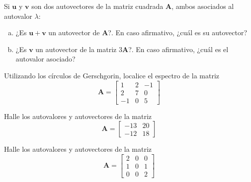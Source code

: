 \documentclass[11pt]{article}
\begin{document}
\begin{question} %
	Si $\bm{u}$ y $\bm{v}$ son dos autovectores de la matriz cuadrada $\bm{A}$, ambos asociados al autovalor $\lambda$:
	\begin{enumerate}[a)]
		\item ¿Es $\bm{u} + \bm{v}$ un autovector de $\bm{A}$?. En caso afirmativo, ¿cuál es su autovector?
		\item ¿Es $\bm{v}$ un autovector de la matriz $3 \bm{A}$?. En caso afirmativo, ¿cuál es el autovalor asociado?
	\end{enumerate}
\end{question}

\begin{question} %
	Utilizando los círculos de Gerschgorin, localice el espectro de la matriz
	\[ \bm{A} =
		\begin{bmatrix}
			1  & 2 & -1 \\
			2  & 7 & 0  \\
			-1 & 0 & 5
		\end{bmatrix} \]
\end{question}

\begin{question} %
	Halle los autovalores y autovectores de la matriz
	\[ \bm{A} = \begin{bmatrix} -13 & 20 \\ -12 & 18 \end{bmatrix} \]
\end{question}


\begin{question} %
	Halle los autovalores y autovectores de la matriz
	\[ \bm{A} = \begin{bmatrix} 2 & 0 & 0 \\ 1 & 0 & 1 \\ 0 & 0 & 2 \end{bmatrix} \]
\end{question}
\end{document}

